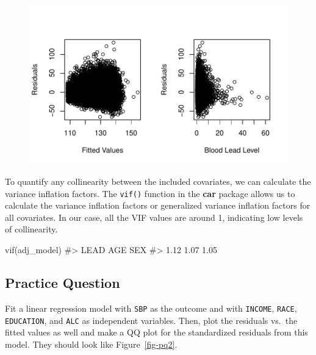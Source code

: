 \documentclass[
  letterpaper,
]{krantz}
\makeatletter
\newenvironment{Shaded}{\begin{snugshade}}{\end{snugshade}}
\newcommand{\CommentTok}[1]{\textcolor[rgb]{0.37,0.37,0.37}{#1}}
\newcommand{\FunctionTok}[1]{\textcolor[rgb]{0.28,0.35,0.67}{#1}}
\newcommand{\NormalTok}[1]{\textcolor[rgb]{0.00,0.23,0.31}{#1}}
\newenvironment{kframe}{%
\medskip{}
\setlength{\fboxsep}{.8em}
 \def\at@end@of@kframe{}%
 \ifinner\ifhmode%
  \def\at@end@of@kframe{\end{minipage}}%
  \begin{minipage}{\columnwidth}%
 \fi\fi%
 \def\FrameCommand##1{\hskip\@totalleftmargin \hskip-\fboxsep
 \colorbox{shadecolor}{##1}\hskip-\fboxsep
     \hskip-\linewidth \hskip-\@totalleftmargin \hskip\columnwidth}%
 \MakeFramed {\advance\hsize-\width
   \@totalleftmargin\z@ \linewidth\hsize
   \@setminipage}}%
 {\par\unskip\endMakeFramed%
 \at@end@of@kframe}
\renewenvironment{Shaded}{\begin{kframe}}{\end{kframe}}
\makeatother
\begin{document}
\begin{figure}[H]

{\centering \includegraphics[width=1\textwidth,height=\textheight]{book/10_linear_regression_files/figure-pdf/unnamed-chunk-19-1.pdf}

}

\end{figure}

To quantify any collinearity between the included covariates, we can
calculate the variance inflation factors. The \texttt{vif()} function in
the \textbf{car} package allows us to calculate the variance inflation
factors or generalized variance inflation factors for all covariates. In
our case, all the VIF values are around 1, indicating low levels of
collinearity.

\begin{Shaded}
\begin{Highlighting}[]
\FunctionTok{vif}\NormalTok{(adj\_model)}
\CommentTok{\#\textgreater{} LEAD  AGE  SEX }
\CommentTok{\#\textgreater{} 1.12 1.07 1.05}
\end{Highlighting}
\end{Shaded}

\hypertarget{practice-question-21}{%
\subsection{Practice Question}\label{practice-question-21}}

Fit a linear regression model with \texttt{SBP} as the outcome and with
\texttt{INCOME}, \texttt{RACE}, \texttt{EDUCATION}, and \texttt{ALC} as
independent variables. Then, plot the residuals vs.~the fitted values as
well and make a QQ plot for the standardized residuals from this model.
They should look like Figure~\ref{fig-pq2}.
\end{document}
